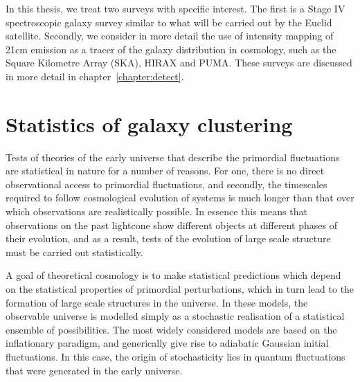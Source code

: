 In this thesis, we treat two surveys with specific interest. The first is a Stage IV spectroscopic galaxy survey similar to what will be carried out by the Euclid satellite. Secondly, we consider in more detail the use of intensity mapping of 21cm emission as a tracer of the galaxy distribution in cosmology, such as the Square Kilometre Array (SKA), HIRAX and PUMA. These surveys are discussed in more detail in chapter~\ref{chapter:detect}. 


\section{Statistics of galaxy clustering}
\label{section:introbisp} 

Tests of theories of the early universe that describe the primordial fluctuations are statistical in nature for a number of reasons. For one, there is no direct observational access to primordial fluctuations, and secondly, the timescales required to follow cosmological evolution of systems is much longer than that over which observations are realistically possible. In essence this means that observations on the past lightcone show different objects at different phases of their evolution, and as a result, tests of the evolution of large scale structure must be carried out statistically. 

A goal of theoretical cosmology is to make statistical predictions which depend on the statistical properties of primordial perturbations, which in turn lead to the formation of large scale structures in the universe. In these models, the observable universe is modelled simply as a stochastic realisation of a statistical ensemble of possibilities. The most widely considered models are based on the inflationary paradigm, and generically give rise to adiabatic Gaussian initial fluctuations. In this case, the origin of stochasticity lies in quantum fluctuations that were generated in the early universe. 


